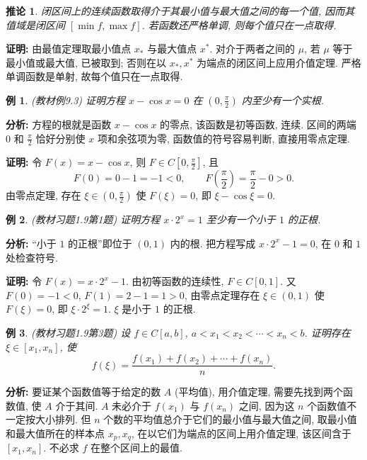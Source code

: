 \documentclass[UTF8,openany]{ctexbook}
\theoremstyle{chinesetextbook}
\newtheorem{example}{例}[section]
\newenvironment{cnproof}{\par\indent\textbf{证明:} \ignorespaces}{\par}
\newtheorem*{corollarysingle}{推论}
\begin{document}
\begin{corollarysingle}
闭区间上的连续函数取得介于其最小值与最大值之间的每一个值, 因而其值域是闭区间 $[\min f,\max f]$. 若函数还严格单调, 则每个值只在一点取得.
\end{corollarysingle}
\begin{cnproof}
由最值定理取最小值点 $x_*$ 与最大值点 $x^*$. 对介于两者之间的 $\mu$, 若 $\mu$ 等于最小值或最大值, 已被取到; 否则在以 $x_*,x^*$ 为端点的闭区间上应用介值定理. 严格单调函数是单射, 故每个值只在一点取得.
\end{cnproof}
\begin{example}
\textnormal{(教材例9.3)} 证明方程 $x-\cos x=0$ 在 $\displaystyle\left(0,\frac\pi2\right)$ 内至少有一个实根.
\end{example}
\par\indent\textbf{分析:} 方程的根就是函数 $x-\cos x$ 的零点, 该函数是初等函数, 连续. 区间的两端 $0$ 和 $\displaystyle\frac\pi2$ 恰好分别使 $x$ 项和余弦项为零, 函数值的符号容易判断, 直接用零点定理.
\begin{cnproof}
令 $F(x)=x-\cos x$, 则 $\displaystyle F\in C\left[0,\frac\pi2\right]$, 且
\[
F(0)=0-1=-1<0,\qquad F\!\left(\frac\pi2\right)=\frac\pi2-0>0.
\]
由零点定理, 存在 $\displaystyle\xi\in\left(0,\frac\pi2\right)$ 使 $F(\xi)=0$, 即 $\xi-\cos\xi=0$.
\end{cnproof}
\begin{example}
\textnormal{(教材习题1.9第1题)} 证明方程 $x\cdot2^x=1$ 至少有一个小于 $1$ 的正根.
\end{example}
\par\indent\textbf{分析:} “小于 $1$ 的正根”即位于 $(0,1)$ 内的根. 把方程写成 $x\cdot2^x-1=0$, 在 $0$ 和 $1$ 处检查符号.
\begin{cnproof}
令 $F(x)=x\cdot2^x-1$. 由初等函数的连续性, $F\in C[0,1]$. 又 $F(0)=-1<0$, $F(1)=2-1=1>0$, 由零点定理存在 $\xi\in(0,1)$ 使 $F(\xi)=0$, 即 $\xi\cdot2^\xi=1$. $\xi$ 是小于 $1$ 的正根.
\end{cnproof}
\begin{example}
\textnormal{(教材习题1.9第3题)} 设 $f\in C[a,b]$, $a<x_1<x_2<\cdots<x_n<b$. 证明存在 $\xi\in[x_1,x_n]$, 使
\[
f(\xi)=\frac{f(x_1)+f(x_2)+\cdots+f(x_n)}n.
\]
\end{example}
\par\indent\textbf{分析:} 要证某个函数值等于给定的数 $A$ (平均值), 用介值定理, 需要先找到两个函数值, 使 $A$ 介于其间. $A$ 未必介于 $f(x_1)$ 与 $f(x_n)$ 之间, 因为这 $n$ 个函数值不一定按大小排列. 但 $n$ 个数的平均值总介于它们的最小值与最大值之间, 取最小值和最大值所在的样本点 $x_p,x_q$, 在以它们为端点的区间上用介值定理, 该区间含于 $[x_1,x_n]$. 不必求 $f$ 在整个区间上的最值.
\end{document}
